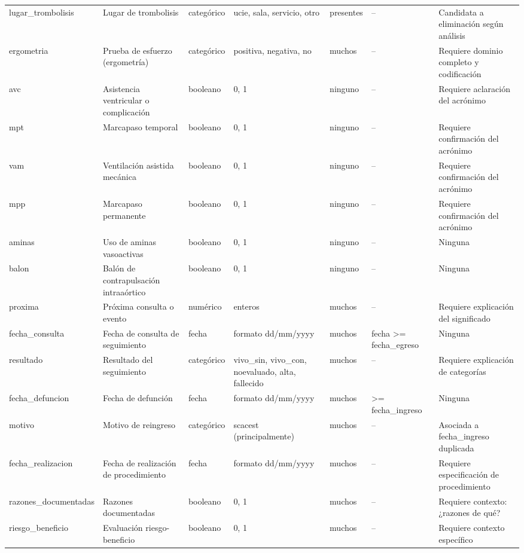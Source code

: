 \documentclass[11pt,a4paper]{article}
\begin{document}
\begin{longtable}{@{}L{0.095\textwidth} L{0.17\textwidth} L{0.07\textwidth} L{0.16\textwidth} L{0.14\textwidth} L{0.13\textwidth} L{0.15\textwidth}@{}}
lugar\_trombolisis & Lugar de trombolisis & categórico & ucie, sala, servicio, otro & presentes & -- & Candidata a eliminación según análisis \\
ergometria & Prueba de esfuerzo (ergometría) & categórico & positiva, negativa, no & muchos & -- & Requiere dominio completo y codificación \\
avc & Asistencia ventricular o complicación & booleano & 0, 1 & ninguno & -- & Requiere aclaración del acrónimo \\
mpt & Marcapaso temporal & booleano & 0, 1 & ninguno & -- & Requiere confirmación del acrónimo \\
vam & Ventilación asistida mecánica & booleano & 0, 1 & ninguno & -- & Requiere confirmación del acrónimo \\
mpp & Marcapaso permanente & booleano & 0, 1 & ninguno & -- & Requiere confirmación del acrónimo \\
aminas & Uso de aminas vasoactivas & booleano & 0, 1 & ninguno & -- & Ninguna \\
balon & Balón de contrapulsación intraaórtico & booleano & 0, 1 & ninguno & -- & Ninguna \\
proxima & Próxima consulta o evento & numérico & enteros & muchos & -- & Requiere explicación del significado \\
fecha\_consulta & Fecha de consulta de seguimiento & fecha & formato dd/mm/yyyy & muchos & fecha >= fecha\_egreso & Ninguna \\
resultado & Resultado del seguimiento & categórico & vivo\_sin, vivo\_con, noevaluado, alta, fallecido & muchos & -- & Requiere explicación de categorías \\
fecha\_defuncion & Fecha de defunción & fecha & formato dd/mm/yyyy & muchos & >= fecha\_ingreso & Ninguna \\
motivo & Motivo de reingreso & categórico & scacest (principalmente) & muchos & -- & Asociada a fecha\_ingreso duplicada \\
fecha\_realizacion & Fecha de realización de procedimiento & fecha & formato dd/mm/yyyy & muchos & -- & Requiere especificación de procedimiento \\
razones\_documentadas & Razones documentadas & booleano & 0, 1 & muchos & -- & Requiere contexto: ¿razones de qué? \\
riesgo\_beneficio & Evaluación riesgo-beneficio & booleano & 0, 1 & muchos & -- & Requiere contexto específico \\

\end{longtable}
\end{document}
